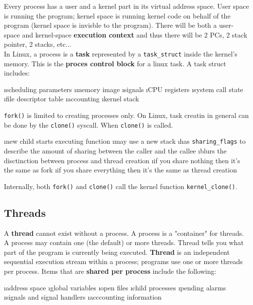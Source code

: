\documentclass{article}
\begin{document}
    Every process has a user and a kernel part in its virtual address space. User space is running the program; kernel space is running kernel code on behalf of the program (kernel space is invisble to the program). There will be both a user-space and kernel-space \textbf{execution context} and thus there will be 2 PCs, 2 stack pointer, 2 stacks, etc... \\

    \noindent In Linux, a process is a \textbf{task} represented by a \texttt{task\_struct} inside the kernel's memory. This is the \textbf{proces control block} for a linux task. A task struct includes:

    \bl
    \i scheduling parameters
    \i memory image
    \i signals
    \i CPU registers
    \i system call state
    \i file descriptor table
    \i accounting
    \i kernel stack
    \el

    \noindent \texttt{fork()} is limited to creating processes only. On Linux, task creatin in general can be done by the \texttt{clone()} syscall. When \texttt{clone()} is called. 

    \bl
    \i new child starts executing function
    \i may use a new stack
    \i has \texttt{sharing\_flags} to describe the amount of sharing between the caller and the callee
    \i blurs the disctinction between process and thread creation 
    \bl
    \i if you share nothing then it's the same as fork
    \i if you share everything then it's the same as thread creation
    \el
    \el

    \noindent Internally, both \texttt{fork()} and \texttt{clone()} call the kernel function \texttt{kernel\_clone()}.

\subsection{Threads}

    A \textbf{thread} cannot exist without a process. A process is a "container" for threads. A process may contain one (the default) or more threads. Thread tells you what part of the program is currently being executed. \textbf{Thread} is an independent sequential execution stream within a process; programs use one or more threads per process. Items that are \textbf{shared per process} include the following:

    \bl
    \i address space
    \i global variables
    \i open files
    \i child processes
    \i pending alarms
    \i signals and signal handlers
    \i acccounting information
    \el
\end{document}

